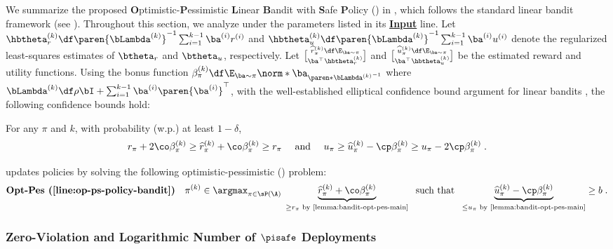 We summarize the proposed \textbf{O}ptimistic-\textbf{P}essimistic \textbf{L}inear \textbf{B}andit with \textbf{S}afe \textbf{P}olicy (\Banditalgo) in , which follows the standard linear bandit framework (see \citet{abbasi2011improved}).
Throughout this section, we analyze  under the parameters listed in its \hyperref[algo:zero-vio-bandit]{\textbf{Input}} line.
Let $\hbtheta^{(k)}_r \df \paren{\bLambda^{(k)}}^{-1}\sum_{i=1}^{k-1} \ba^{(i)} r^{(i)}$ and $\hbtheta^{(k)}_u \df \paren{\bLambda^{(k)}}^{-1}\sum_{i=1}^{k-1} \ba^{(i)} u^{(i)} $ denote the regularized least-squares estimates of $\btheta_r$ and $\btheta_u$, respectively.
Let \(\widehat{r}^{(k)}_\pi\df \E_{\ba \sim \pi}\brack{\ba^\top \hbtheta_r^{(k)}}\) and \(\widehat{u}^{(k)}_\pi \df \E_{\ba \sim \pi}\brack{\ba^\top \hbtheta_u^{(k)}}\) be the estimated reward and utility functions.
Using the bonus function 
\(\beta^{(k)}_\pi \df \E_{\ba \sim \pi}\norm*{\ba}_{\paren*{\bLambda^{(k)}}^{-1}}\) where \(\bLambda^{(k)} \df \rho \bI + \sum_{i=1}^{k-1} \ba^{(i)} \paren{\ba^{(i)}}^\top \), with the well-established elliptical confidence bound argument for linear bandits \citep{abbasi2011improved}, the following confidence bounds hold:
\begin{lemma}\label{lemma:bandit-opt-pes-main}
For any $\pi$ and $k$, with probability (w.p.) at least $1-\delta$,
$$
r_{\pi} + 2\co \beta^{(k)}_{\pi} \geq 
\widehat{r}_{\pi}^{(k)} + \co \beta^{(k)}_{\pi} \geq r_{\pi} \quad \text{ and }\quad
u_{\pi} \geq \widehat{u}_{\pi}^{(k)} - \cp \beta^{(k)}_{\pi}
\geq u_{\pi} - 2\cp \beta^{(k)}_{\pi}\;.
$$
\end{lemma}
 updates policies by solving the following optimistic-pessimistic (\optpes) problem:
\begin{align}\label{eq:op-ps-bandit-propose}
\textbf{Opt-Pes (\Cref{line:op-ps-policy-bandit})}
\quad
\pi^{(k)} \in 
\argmax_{\pi \in \sP(\A)}\; \underbrace{\widehat{r}^{(k)}_\pi + \co \beta^{(k)}_\pi}_{\geq r_\pi \text{ by \Cref{lemma:bandit-opt-pes-main}}} \; \text { such that }\; \underbrace{\widehat{u}^{(k)}_\pi - \cp \beta^{(k)}_\pi }_{\leq u_\pi \text{ by \Cref{lemma:bandit-opt-pes-main}}} \geq b \;.
\end{align}

\subsubsection{Zero-Violation and Logarithmic Number of $\pisafe$ Deployments}\label{subsec:zero-vio-bandit}

